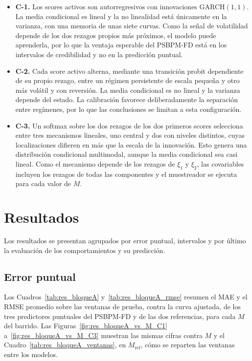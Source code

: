 \begin{itemize}
    \item \textbf{C-1.} Los scores activos son autorregresivos con innovaciones GARCH$(1,1)$. La media condicional es lineal y la no linealidad está únicamente en la varianza, con una memoria de unas siete curvas. Como la señal de volatilidad depende de los dos rezagos propios más próximos, el modelo puede aprenderla, por lo que la ventaja esperable del PSBPM-FD está en los intervalos de credibilidad y no en la predicción puntual.

    \item \textbf{C-2.} Cada score activo alterna, mediante una transición probit dependiente de su propio rezago, entre un régimen persistente de escala pequeña y otro más volátil y con reversión. La media condicional es no lineal y la varianza depende del estado. La calibración favorece deliberadamente la separación entre regímenes, por lo que las conclusiones se limitan a esta configuración.

    \item \textbf{C-3.} Un softmax sobre los dos rezagos de los dos primeros scores selecciona entre tres mecanismos lineales, uno central y dos con niveles distintos, cuyas localizaciones difieren en más que la escala de la innovación. Esto genera una distribución condicional multimodal, aunque la media condicional sea casi lineal. Como el mecanismo depende de los rezagos de $\xi_1$ y $\xi_2$, las covariables incluyen los rezagos de todas las componentes y el muestreador se ejecuta para cada valor de $M$.
\end{itemize}


\section{Resultados}
\label{03_08_00_resultados}

Los resultados se presentan agrupados por error puntual, intervalos y por último la evaluación de los comportamientos y su predicción.

\subsection{Error puntual}
\label{03_08_01_error_puntual}

Los Cuadros~\ref{tab:res_bloqueA} y~\ref{tab:res_bloqueA_rmse} resumen el MAE y el RMSE promedio sobre las ventanas de prueba, contra la curva ajustada, de los tres predictores puntuales del PSBPM-FD y de las dos referencias, para cada $M$ del barrido. Las Figuras~\ref{fig:res_bloqueA_vs_M_C1} a~\ref{fig:res_bloqueA_vs_M_C3} muestran las mismas cifras contra $M$ y el Cuadro~\ref{tab:res_bloqueA_ventanas}, en $M_{\mathrm{ref}}$, cómo se reparten las ventanas entre los modelos.

